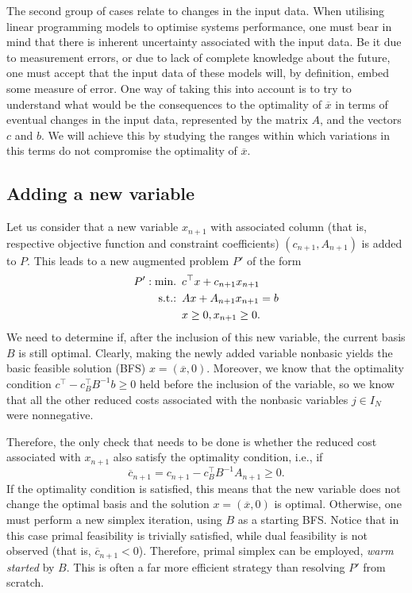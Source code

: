 The second group of cases relate to changes in the input data. When utilising linear programming models to optimise systems performance, one must bear in mind that there is inherent uncertainty associated with the input data. Be it due to measurement errors, or due to lack of complete knowledge about the future, one must accept that the input data of these models will, by definition, embed some measure of error. One way of taking this into account is to try to understand what would be the consequences to the optimality of $\overline{x}$ in terms of eventual changes in the input data, represented by the matrix $A$, and the vectors $c$ and $b$. We will achieve this by studying the ranges within which variations in this terms do not compromise the optimality of $\overline{x}$. 


\subsection{Adding a new variable} \label{section_611}

Let us consider that a new variable $x_{n+1}$ with associated column (that is, respective objective function and constraint coefficients) $(c_{n+1}, A_{n+1})$ is added to $P$. This leads to a new augmented problem $P'$ of the form
%
\begin{align*}
	P': \mathop{\text{min.~}} \, &c^\top x + c_{n+1}x_{n+1}\\
	\mathop{\text{s.t.:~}} \, & Ax + A_{n+1}x_{n+1}= b \\
	& x \geq 0, x_{n+1} \geq 0. 	
\end{align*}
%
We need to determine if, after the inclusion of this new variable, the current basis $B$ is still optimal. Clearly, making the newly added variable nonbasic yields the basic feasible solution (BFS) $x = (\overline{x}, 0)$. Moreover, we know that the optimality condition $c^\top - c_B^\top B^{-1}b \geq 0$ held before the inclusion of the variable, so we know that all the other reduced costs associated with the nonbasic variables $j \in I_N$ were nonnegative. 

Therefore, the only check that needs to be done is whether the reduced cost associated with $x_{n+1}$ also satisfy the optimality condition, i.e., if
%
\begin{equation*}
	\overline{c}_{n+1} = c_{n+1} - c_B^\top B^{-1}A_{n+1} \geq 0.	
\end{equation*}
%
If the optimality condition is satisfied, this means that the new variable does not change the optimal basis and the solution $x = (\overline{x}, 0)$ is optimal. Otherwise, one must perform a new simplex iteration, using $B$ as a starting BFS. Notice that in this case primal feasibility is trivially satisfied, while dual feasibility is not observed (that is, $\overline{c}_{n+1} < 0$). Therefore, primal simplex can be employed, \emph{warm started} by $B$. This is often a far more efficient strategy than resolving $P'$ from scratch.

